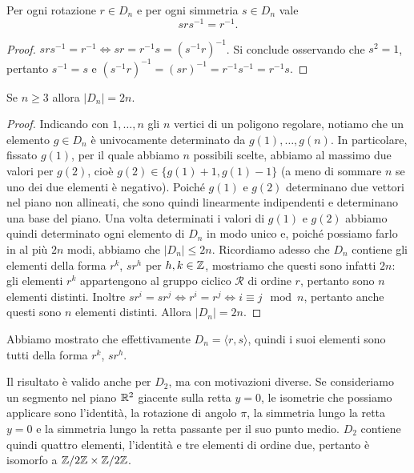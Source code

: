 \documentclass[11pt]{scrartcl}
\begin{document}
\begin{lemma}
    Per ogni rotazione $r \in D_n$ e per ogni simmetria $s \in D_n$ vale
    \[srs^{-1} = r^{-1}.\]
\end{lemma}

\begin{proof}
    $srs^{-1} = r^{-1} \iff sr = r^{-1}s = (s^{-1}r)^{-1}$. Si conclude
    osservando che $s^2 = 1$, pertanto $s^{-1} = s$ e $(s^{-1}r)^{-1} =
    (sr)^{-1} = r^{-1}s^{-1} = r^{-1}s$.
\end{proof}

\begin{proposition}
    Se $n \geq 3$ allora $|D_n| = 2n$.
\end{proposition}

\begin{proof}
    Indicando con $1, \ldots, n$ gli $n$ vertici di un poligono regolare, notiamo
    che un elemento $g \in D_n$ è univocamente determinato da $g(1), \ldots, g(n)$.
    In particolare, fissato $g(1)$, per il quale abbiamo $n$ possibili scelte,
    abbiamo al massimo due valori per $g(2)$, cioè $g(2) \in \{g(1) + 1, g(1) - 1\}$
    (a meno di sommare $n$ se uno dei due elementi è negativo). Poiché $g(1)$
    e $g(2)$ determinano due vettori nel piano non allineati, che sono quindi
    linearmente indipendenti e determinano una base del piano. Una volta 
    determinati i valori di $g(1)$ e $g(2)$ abbiamo quindi determinato ogni
    elemento di $D_n$ in modo unico e, poiché possiamo farlo in al più $2n$ modi, 
    abbiamo che $|D_n| \leq 2n$. Ricordiamo adesso che $D_n$ contiene gli elementi
    della forma $r^k$, $sr^h$ per $h, k \in \mathbb Z$, mostriamo che questi sono 
    infatti $2n$: gli elementi $r^k$ appartengono al gruppo ciclico $\mathcal{R}$
    di ordine $r$, pertanto sono $n$ elementi distinti. Inoltre $sr^i = sr^j
    \iff r^i = r^j\iff i \equiv j \mod n$, pertanto anche questi sono $n$
    elementi distinti. Allora $|D_n| = 2n$.
\end{proof}

\begin{remark}
    Abbiamo mostrato che effettivamente $D_n = \langle r, s\rangle$, quindi i
    suoi elementi sono tutti della forma $r^k$, $sr^h$. 
\end{remark}

\begin{remark}
    Il risultato è valido anche per $D_2$, ma con motivazioni diverse. 
    Se consideriamo un segmento nel piano $\mathbb R^2$ giacente sulla retta $y = 0$, 
    le isometrie che possiamo applicare sono l'identità, la rotazione di 
    angolo $\pi$, la simmetria lungo la retta $y = 0$ e la simmetria lungo la
    retta passante per il suo punto medio. $D_2$ contiene quindi quattro elementi,
    l'identità e tre elementi di ordine due, pertanto è isomorfo a $\mathbb{Z}/{2}\mathbb{Z}\times\mathbb{Z}/{2}\mathbb{Z}$.
\end{remark}
\end{document}
